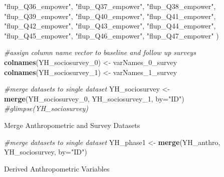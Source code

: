 \documentclass[]{article}
\newenvironment{Shaded}{\begin{snugshade}}{\end{snugshade}}
\newcommand{\KeywordTok}[1]{\textcolor[rgb]{0.13,0.29,0.53}{\textbf{#1}}}
\newcommand{\DataTypeTok}[1]{\textcolor[rgb]{0.13,0.29,0.53}{#1}}
\newcommand{\DecValTok}[1]{\textcolor[rgb]{0.00,0.00,0.81}{#1}}
\newcommand{\StringTok}[1]{\textcolor[rgb]{0.31,0.60,0.02}{#1}}
\newcommand{\CommentTok}[1]{\textcolor[rgb]{0.56,0.35,0.01}{\textit{#1}}}
\newcommand{\NormalTok}[1]{#1}
\begin{document}
\begin{Shaded}
\begin{Highlighting}[]
  \StringTok{"flup_Q36_empower"}\NormalTok{, }\StringTok{"flup_Q37_empower"}\NormalTok{, }\StringTok{"flup_Q38_empower"}\NormalTok{,}
  \StringTok{"flup_Q39_empower"}\NormalTok{, }\StringTok{"flup_Q40_empower"}\NormalTok{, }\StringTok{"flup_Q41_empower"}\NormalTok{,}
  \StringTok{"flup_Q42_empower"}\NormalTok{, }\StringTok{"flup_Q43_empower"}\NormalTok{, }\StringTok{"flup_Q44_empower"}\NormalTok{,}
  \StringTok{"flup_Q45_empower"}\NormalTok{, }\StringTok{"flup_Q46_empower"}\NormalTok{, }\StringTok{"flup_Q47_empower"}
\NormalTok{)}

\CommentTok{#assign column name vector to baseline and follow up surveys}
\KeywordTok{colnames}\NormalTok{(YH_sociosurvey_}\DecValTok{0}\NormalTok{) <-}\StringTok{ }\NormalTok{varNames_0_survey}
\KeywordTok{colnames}\NormalTok{(YH_sociosurvey_}\DecValTok{1}\NormalTok{) <-}\StringTok{ }\NormalTok{varNames_1_survey}

\CommentTok{#merge datasets to single dataset}
\NormalTok{YH_sociosurvey <-}\StringTok{ }\KeywordTok{merge}\NormalTok{(YH_sociosurvey_}\DecValTok{0}\NormalTok{, YH_sociosurvey_}\DecValTok{1}\NormalTok{, }\DataTypeTok{by=}\StringTok{"ID"}\NormalTok{)}
\CommentTok{#glimpse(YH_sociosurvey)}
\end{Highlighting}
\end{Shaded}

Merge Anthropometric and Survey Datasets

\begin{Shaded}
\begin{Highlighting}[]
\CommentTok{#merge datasets to single dataset}
\NormalTok{YH_phase1 <-}\StringTok{ }\KeywordTok{merge}\NormalTok{(YH_anthro, YH_sociosurvey, }\DataTypeTok{by=}\StringTok{"ID"}\NormalTok{)}
\end{Highlighting}
\end{Shaded}

Derived Anthropometric Variables
\end{document}

